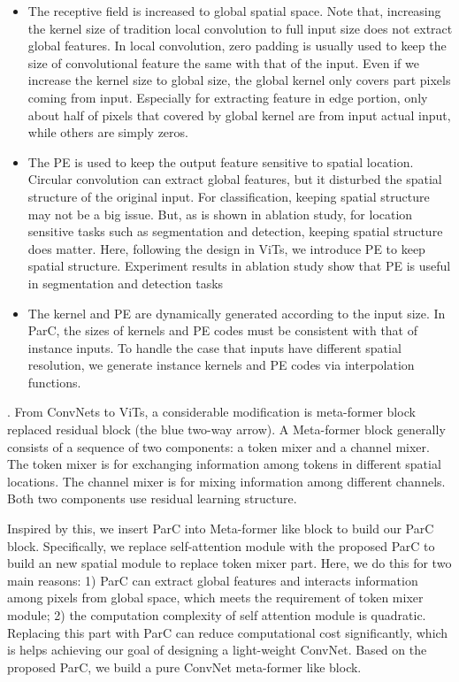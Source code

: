 \documentclass[10pt,twocolumn,letterpaper]{article}
\begin{document}
\begin{itemize}
\item The receptive field is increased to global spatial space. Note that, increasing the kernel size of tradition local convolution to full input size does not extract global features. In local convolution, zero padding is usually used to keep the size of convolutional feature the same with that of the input. Even if we increase the kernel size to global size, the global kernel only covers part pixels coming from input. Especially for extracting feature in edge portion, only about half of pixels that covered by global kernel are from input actual input, while others are simply zeros. 

\item The PE is used to keep the output feature sensitive to spatial location. Circular convolution can extract global features, but it disturbed the spatial structure of the original input. For classification, keeping spatial structure may not be a big issue. But, as is shown in ablation study, for location sensitive tasks such as segmentation and detection, keeping spatial structure does matter. Here, following the design in ViTs, we introduce PE to keep spatial structure. Experiment results in ablation study show that PE is useful in segmentation and detection tasks

\item The kernel and PE are dynamically generated according to the input size. In ParC, the sizes of kernels and PE codes must be consistent with that of instance inputs. To handle the case that inputs have different spatial resolution, we generate instance kernels and PE codes via interpolation functions. 

\end{itemize}

.  From ConvNets to ViTs, a considerable modification is meta-former block replaced residual block (the blue two-way arrow). A Meta-former block generally consists of a sequence of two components: a token mixer and a channel mixer. The token mixer is for exchanging information among tokens in different spatial locations. The channel mixer is for mixing information among different channels. Both two components use residual learning structure. 

Inspired by this, we insert ParC into Meta-former like block to build our ParC block. Specifically, we replace self-attention module with the proposed ParC to build an new spatial module to replace token mixer part. Here, we do this for two main reasons: 1) ParC can extract global features and interacts information among pixels from global space, which meets the requirement of token mixer module; 2) the computation complexity of self attention module is quadratic. Replacing this part with ParC can reduce computational cost significantly, which is helps achieving our goal of designing a light-weight ConvNet. Based on the proposed ParC, we build a pure ConvNet meta-former like block.
\end{document}
